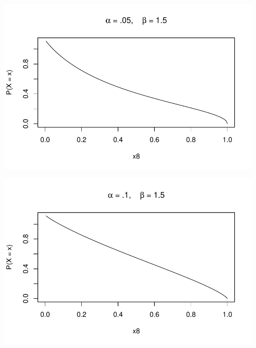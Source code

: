 \documentclass[12pt]{article}\usepackage[]{graphicx}\usepackage[]{color}
\makeatletter
\def\maxwidth{ %
  \ifdim\Gin@nat@width>\linewidth
    \linewidth
  \else
    \Gin@nat@width
  \fi
}
\newenvironment{knitrout}{}{} %
\makeatother
\begin{document}
\begin{enumerate}
\begin{enumerate}[label = (\alph*)]
\begin{knitrout}
\color{fgcolor}

{\centering \includegraphics[width=\maxwidth]{figure/plot8c-1} 

}



\end{knitrout}

\begin{knitrout}
\color{fgcolor}

{\centering \includegraphics[width=\maxwidth]{figure/plot8d-1} 

}



\end{knitrout}
     

\end{enumerate}
\end{enumerate}
\end{document}
